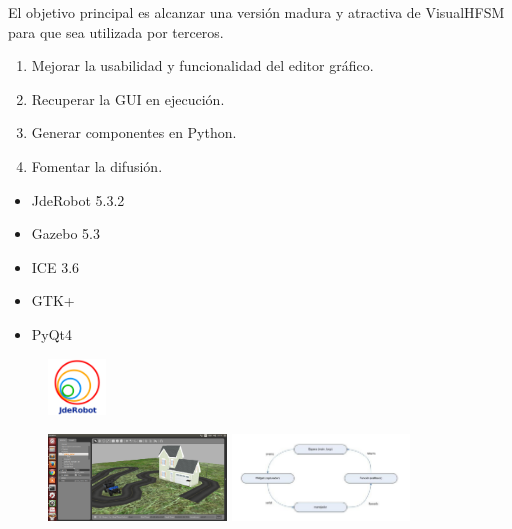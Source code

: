 \documentclass[notes,slidesec,a4]{seminar}
\begin{document}
\begin{hslide}

El objetivo principal es alcanzar una versión madura y atractiva de VisualHFSM para que sea utilizada por terceros.

\begin{enumerate}
\item Mejorar la usabilidad y funcionalidad del editor gráfico.
\item Recuperar la GUI en ejecución.
\item Generar componentes en Python.
\item Fomentar la difusión.
\end{enumerate}

\end{hslide}


\begin{hslide}


\begin{minipage}[t]{0.5\textwidth}
\begin{center}
	\begin{itemize}
	\item JdeRobot 5.3.2
	\item Gazebo 5.3
	\item ICE 3.6
	\item GTK+
	\item PyQt4
	\end{itemize}
	\begin{figure}
		\includegraphics[height=1.5cm]{imgs/logoJdeRobot.png}
	\end{figure}
\end{center}
\end{minipage}
\begin{minipage}[t]{0.5\textwidth}
\begin{center}
	\begin{figure}
		\includegraphics[height=2.3cm]{imgs/gazeboWorld.png}
		\vspace{0.6cm}
		\includegraphics[height=2.3cm]{imgs/bucleGTK.png}
	\end{figure}
\end{center}
\end{minipage}
	
\end{hslide}
\end{document}
